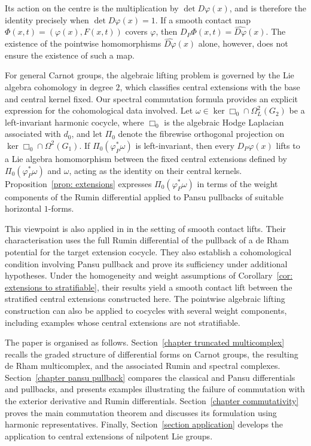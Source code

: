 \documentclass[dvipsnames]{amsart}
\theoremstyle{definition}
\theoremstyle{definition}
\numberwithin{equation}{section}
\begin{document}
Its action on the centre is the multiplication by
$\det D\varphi(x)$, and is therefore the identity precisely
when $\det D\varphi(x)=1$. If a smooth contact map
$\Phi(x,t)=(\varphi(x),F(x,t))$ covers $\varphi$, then
$D_P\Phi(x,t)=\widehat{D\varphi}(x)$. The existence of the
pointwise homomorphisms $\widehat{D\varphi}(x)$ alone,
however, does not ensure the existence of such a map.

For general Carnot groups, the algebraic lifting problem
is governed by the Lie algebra cohomology in degree $2$, which
classifies central extensions with the base and central
kernel fixed. Our spectral commutation formula provides
an explicit expression for the cohomological data involved.
Let $\omega\in\ker\Box_0\cap\Omega_L^2(G_2)$
be a left-invariant harmonic cocycle, where $\Box_0$ is the
algebraic Hodge Laplacian associated with $d_0$, and let
$\Pi_0$ denote the fibrewise orthogonal projection on $\ker\Box_0\cap\Omega^2(G_1)$.
If $\Pi_0(\varphi_P^*\omega)$ is left-invariant, then every
$D_P\varphi(x)$ lifts to a Lie algebra homomorphism between
the fixed central extensions defined by
$\Pi_0(\varphi_P^*\omega)$ and $\omega$, acting as the identity
on their central kernels. Proposition~\ref{prop: extensions}
expresses $\Pi_0(\varphi_P^*\omega)$ in terms of the weight
components of the Rumin differential applied to Pansu
pullbacks of suitable horizontal $1$-forms.

This viewpoint is also applied in
\cite{hakavuori2025smoothcontactliftscentral} in the setting
of smooth contact lifts. Their characterisation uses the
full Rumin differential of the pullback of a de Rham
potential for the target extension cocycle. They also
establish a cohomological condition involving Pansu
pullback and prove its sufficiency under additional
hypotheses. Under the homogeneity and weight assumptions
of Corollary~\ref{cor: extensions to stratifiable}, their
results yield a smooth contact lift between the stratified
central extensions constructed here. The pointwise
algebraic lifting construction can also be applied to cocycles
with several weight components, including examples whose
central extensions are not stratifiable.

The paper is organised as follows. Section~\ref{chapter truncated multicomplex} recalls the graded structure of differential forms on Carnot groups, the resulting de Rham multicomplex, and the associated Rumin and spectral complexes. Section~\ref{chapter pansu pullback} compares the classical and Pansu differentials and pullbacks, and presents examples illustrating the failure of commutation with the exterior derivative and Rumin differentials. Section~\ref{chapter commutativity} proves the main commutation theorem and discusses its formulation using harmonic representatives. Finally, Section~\ref{section application} develops the application to central extensions of nilpotent Lie groups.
\end{document}
